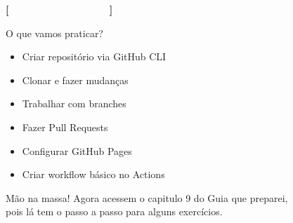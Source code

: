 \documentclass[10pt, brazil]{beamer}
\begin{document}
\begin{frame}{\textcolor{lightpurple}{\textbf{[}} \textbf{\textcolor{white}{Exercícios Práticos}} \textcolor{lightpurple}{\textbf{]}}}
  
  \begin{block}{O que vamos praticar?}
    \begin{itemize}
      \item Criar repositório via GitHub CLI
      \item Clonar e fazer mudanças
      \item Trabalhar com branches
      \item Fazer Pull Requests
      \item Configurar GitHub Pages
      \item Criar workflow básico no Actions
    \end{itemize}
  \end{block}

  \vspace{1em}

  \begin{alertblock}{Mão na massa!}
    Agora acessem o capitulo 9 do Guia que preparei,\\ pois lá tem o passo a passo para alguns exercícios.
  \end{alertblock}

\end{frame}
\end{document}
